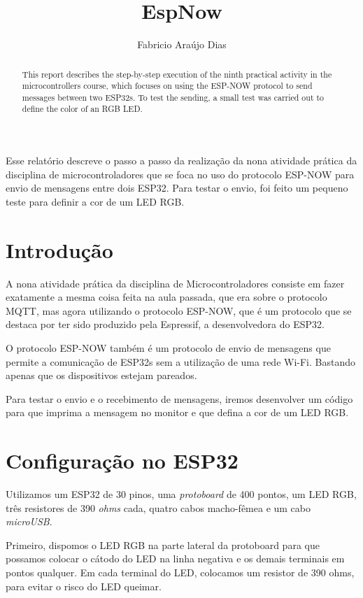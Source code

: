 \documentclass[12pt]{article}
\title{EspNow}
\author{Fabricio Araújo Dias}
\begin{document}
 

\maketitle

\begin{abstract}
    This report describes the step-by-step execution of the ninth practical activity in the microcontrollers course, which focuses on using the ESP-NOW protocol to send messages between two ESP32s. To test the sending, a small test was carried out to define the color of an RGB LED.
\end{abstract}
     
\begin{resumo} 
    Esse relatório descreve o passo a passo da realização da nona atividade prática da disciplina de microcontroladores que se foca no uso do protocolo ESP-NOW para envio de mensagens entre dois ESP32. Para testar o envio, foi feito um pequeno teste para definir a cor de um LED RGB.
\end{resumo}

\section{Introdução}

A nona atividade prática da disciplina de Microcontroladores consiste em fazer exatamente a mesma coisa feita na aula passada, que era sobre o protocolo MQTT, mas agora utilizando o protocolo ESP-NOW, que é um protocolo que se destaca por ter sido produzido pela Espressif, a desenvolvedora do ESP32. 

O protocolo ESP-NOW também é um protocolo de envio de mensagens que permite a comunicação de ESP32s sem a utilização de uma rede Wi-Fi. Bastando apenas que os dispositivos estejam pareados.

Para testar o envio e o recebimento de mensagens, iremos desenvolver um código para que imprima a mensagem no monitor e que defina a cor de um LED RGB.

\section{Configuração no ESP32}

Utilizamos um ESP32 de 30 pinos, uma \textit{protoboard} de 400 pontos, um LED RGB, três resistores de 390 \textit{ohms} cada, quatro cabos macho-fêmea e um cabo \textit{microUSB}.

Primeiro, dispomos o LED RGB na parte lateral da protoboard para que possamos colocar o cátodo do LED na linha negativa e os demais terminais em pontos qualquer. Em cada terminal do LED, colocamos um resistor de 390 ohms, para evitar o risco do LED queimar.
\end{document}
